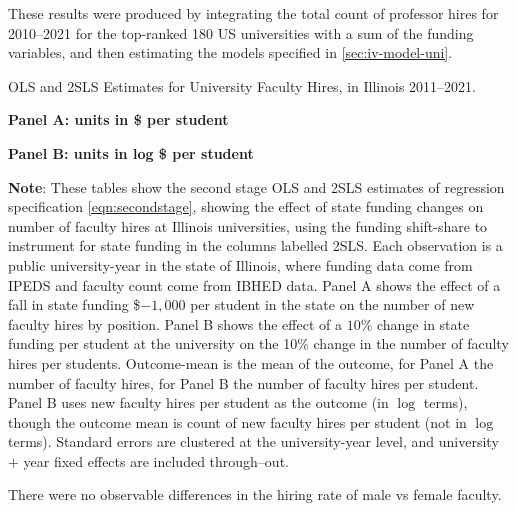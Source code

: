 These results were produced by integrating the total count of professor hires for 2010--2021 for the top-ranked 180 US universities with a sum of the funding variables, and then estimating the models specified in \autoref{sec:iv-model-uni}.
\begin{table}[H]
    \singlespacing
    \centering
    \caption{OLS and 2SLS Estimates for University Faculty Hires, in Illinois 2011--2021.}

    \textbf{Panel A: units in \$ per student}

    \makebox[\textwidth][c]{}
    
    \textbf{Panel B: units in log \$ per student}
    
    \makebox[\textwidth][c]{}
    \label{tab:facultyhires-illinois-reg}
    \justify
    \footnotesize
    \textbf{Note}:
    These tables show the second stage OLS and 2SLS estimates of regression specification \eqref{eqn:secondstage}, showing the effect of state funding changes on number of faculty hires at Illinois universities, using the funding shift-share to instrument for state funding in the columns labelled 2SLS.
    Each observation is a public university-year in the state of Illinois, where funding data come from IPEDS and faculty count come from IBHED data.
    Panel A shows the effect of a fall in state funding \$$-1,000$ per student in the state on the number of new faculty hires by position.
    Panel B shows the effect of a $10$\% change in state funding per student at the university on the 10\% change in the number of faculty hires per students.
    Outcome-mean is the mean of the outcome, for Panel A the number of faculty hires, for Panel B the number of faculty hires per student.
    Panel B uses new faculty hires per student as the outcome (in $\log$ terms), though the outcome mean is count of new faculty hires per student (not in $\log$ terms).
    Standard errors are clustered at the university-year level, and university $+$ year fixed effects are included through--out.
\end{table}

There were no observable differences in the hiring rate of male vs female faculty.

